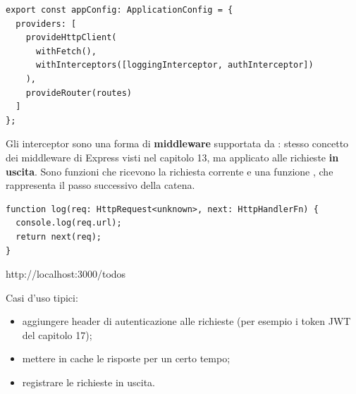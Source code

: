 \begin{affianco}[0.52][c]
\codicepiccolo
\begin{lstlisting}[style=ts, name=app.config.ts]
export const appConfig: ApplicationConfig = {
  providers: [
    provideHttpClient(
      withFetch(),
      withInterceptors([loggingInterceptor, authInterceptor])
    ),
    provideRouter(routes)
  ]
};
\end{lstlisting}
\risultato
\begin{immagine}
\end{immagine}
\end{affianco}

Gli interceptor sono una forma di \textbf{middleware} supportata da
: stesso concetto dei middleware di Express visti nel capitolo
13, ma applicato alle richieste \textbf{in uscita}. Sono funzioni che ricevono
la richiesta corrente e una funzione , che rappresenta il passo
successivo della catena.

\begin{affianco}[0.62][c]
\codicepiccolo
\begin{lstlisting}[style=ts, name=interceptors.ts]
function log(req: HttpRequest<unknown>, next: HttpHandlerFn) {
  console.log(req.url);
  return next(req);
}
\end{lstlisting}
\risultato
\begin{console}
http://localhost:3000/todos
\end{console}
\end{affianco}

Casi d'uso tipici:

\begin{itemize}
  \item aggiungere header di autenticazione alle richieste (per esempio i token
        JWT del capitolo 17);
  \item mettere in cache le risposte per un certo tempo;
  \item registrare le richieste in uscita.
\end{itemize}

